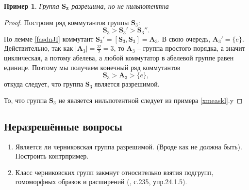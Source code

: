\documentclass{article}
\newtheorem{example}{Пример}[section]
\begin{document}
\begin{example}
    Группа $\mathbf{S_3}$ разрешима, но не нильпотентна
\end{example}
\begin{proof}
    Построим ряд коммутантов группы $\mathbf{S}_3$: $$ \mathbf{S}_3 > \mathbf{S}_3' > \mathbf{S}_3''. $$ По лемме \ref{fasdnJI} коммутант $\mathbf{S}_3' = [\mathbf{S}_3, \mathbf{S}_3] = \mathbf{A}_3$.
    В свою очередь, $\mathbf{A}_3' = \{ e \}$. Действительно, так как $|\mathbf{A}_3| = \frac{3!}{2} = 3$, то $\mathbf{A}_3$ -- группа простого порядка, а значит циклическая, а потому абелева, а любой коммутатор в абелевой группе равен единице. Поэтому мы получаем конечный ряд коммутантов
    \[
        \mathbf{S}_3 > \mathbf{A}_3 > \{ e \},
    \]
    откуда следует, что группа $\mathbf{S}_3$ является разрешимой.

    То, что группа $\mathbf{S}_3$ не является нильпотентной следует из примера \ref{xmeaskl}.y
\end{proof}

\subsection{Неразрешённые вопросы}

\begin{enumerate}
    \item Является ли черниковская группа разрешимой. (Вроде как не должна быть). Построить контрпример.
    \item Класс черниковских групп закмнут относительно взятия подгрупп, гомоморфных образов и расширений (\cite{kargapolov}, с.235, упр.24.1.5).
\end{enumerate}

\newpage



\end{document}
